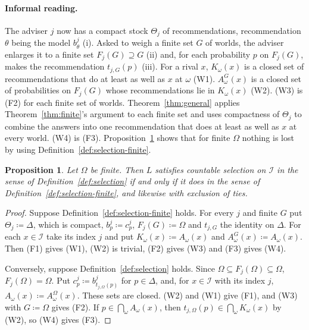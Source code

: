 \documentclass[11pt]{article}
\newtheorem{proposition}[theorem]{Proposition}
\theoremstyle{definition}
\theoremstyle{remark}
\newcommand{\I}{\mathcal I}
\begin{document}
{\color{red}\paragraph{Informal reading.} The adviser $j$ now has a compact stock $\Theta_j$ of recommendations, recommendation $\theta$ being the model $b^j_\theta$ (i). Asked to weigh a finite set $G$ of worlds, the adviser enlarges it to a finite set $F_j(G)\supseteq G$ (ii) and, for each probability $p$ on $F_j(G)$, makes the recommendation $t_{j,G}(p)$ (iii). For a rival $x$, $K_\omega(x)$ is a closed set of recommendations that do at least as well as $x$ at $\omega$ (W1). $A^G_\omega(x)$ is a closed set of probabilities on $F_j(G)$ whose recommendations lie in $K_\omega(x)$ (W2). (W3) is (F2) for each finite set of worlds. Theorem~\ref{thm:general} applies Theorem~\ref{thm:finite}'s argument to each finite set and uses compactness of $\Theta_j$ to combine the answers into one recommendation that does at least as well as $x$ at every world. (W4) is (F3). Proposition~\ref{prop:finite-reduction} shows that for finite $\Omega$ nothing is lost by using Definition~\ref{def:selection-finite}.}

\begingroup\color{red}
\begin{proposition}\label{prop:finite-reduction}
Let $\Omega$ be finite. Then $L$ satisfies countable selection on $\I$ in the sense of Definition~\ref{def:selection} if and only if it does in the sense of Definition~\ref{def:selection-finite}, and likewise with exclusion of ties.
\end{proposition}
\begin{proof}
Suppose Definition~\ref{def:selection-finite} holds. For every $j$ and finite $G$ put $\Theta_j\coloneqq\Delta$, which is compact, $b^j_p\coloneqq c^j_p$, $F_j(G)\coloneqq\Omega$ and $t_{j,G}$ the identity on $\Delta$. For each $x\in\I$ take its index $j$ and put $K_\omega(x)\coloneqq A_\omega(x)$ and $A^G_\omega(x)\coloneqq A_\omega(x)$. Then (F1) gives (W1), (W2) is trivial, (F2) gives (W3) and (F3) gives (W4).

Conversely, suppose Definition~\ref{def:selection} holds. Since $\Omega\subseteq F_j(\Omega)\subseteq\Omega$, $F_j(\Omega)=\Omega$. Put $c^j_p\coloneqq b^j_{t_{j,\Omega}(p)}$ for $p\in\Delta$, and, for $x\in\I$ with its index $j$, $A_\omega(x)\coloneqq A^\Omega_\omega(x)$. These sets are closed. (W2) and (W1) give (F1), and (W3) with $G\coloneqq\Omega$ gives (F2). If $p\in\bigcap_\omega A_\omega(x)$, then $t_{j,\Omega}(p)\in\bigcap_\omega K_\omega(x)$ by (W2), so (W4) gives (F3).
\end{proof}
\endgroup
\end{document}
